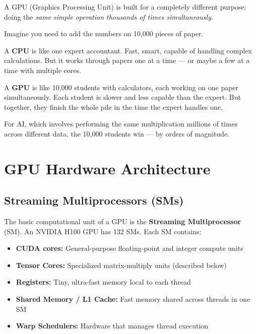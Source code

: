 \documentclass[10pt, oneside, openany]{book}
\newcommand{\analogybox}[2]{\begin{tcolorbox}[analogystyle, title={Analogy: #1}]#2\end{tcolorbox}}
\newcommand{\keyterm}[1]{\textbf{\color{AccentOrange}#1}}
\begin{document}
A GPU (Graphics Processing Unit) is built for a completely different
purpose: doing the \textit{same simple operation thousands of times simultaneously}.

\analogybox{One Expert vs.\ One Thousand Students}{
Imagine you need to add the numbers on 10{,}000 pieces of paper.

A \textbf{CPU} is like one expert accountant.  Fast, smart, capable of handling
complex calculations.  But it works through papers one at a time --- or maybe a
few at a time with multiple cores.

A \textbf{GPU} is like 10{,}000 students with calculators, each working on one
paper simultaneously.  Each student is slower and less capable than the expert.
But together, they finish the whole pile in the time the expert handles one.

For AI, which involves performing the same multiplication millions of times across
different data, the 10{,}000 students win --- by orders of magnitude.
}

\section{GPU Hardware Architecture}

\subsection{Streaming Multiprocessors (SMs)}

The basic computational unit of a GPU is the
\keyterm{Streaming Multiprocessor} (SM).
An NVIDIA H100 GPU has 132 SMs.  Each SM contains:

\begin{itemize}
  \item \textbf{CUDA cores:} General-purpose floating-point and integer compute units
  \item \textbf{Tensor Cores:} Specialized matrix-multiply units (described below)
  \item \textbf{Registers:} Tiny, ultra-fast memory local to each thread
  \item \textbf{Shared Memory / L1 Cache:} Fast memory shared across threads in one SM
  \item \textbf{Warp Schedulers:} Hardware that manages thread execution
\end{itemize}
\end{document}
